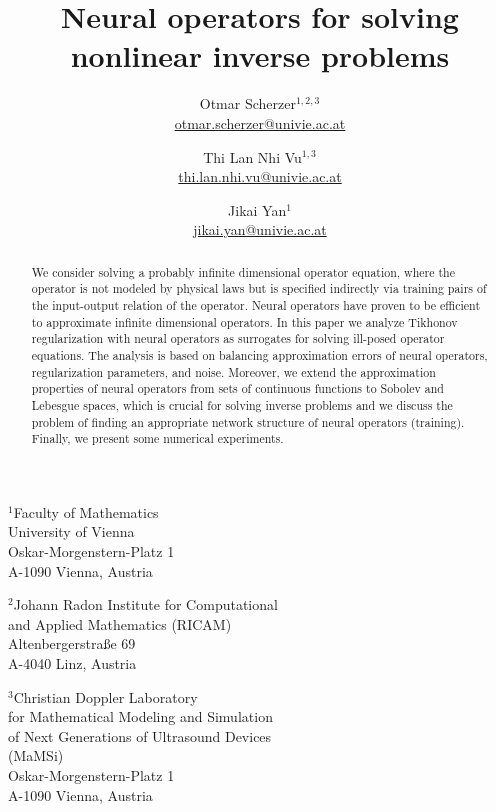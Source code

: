\documentclass[10pt]{article}
\title{Neural operators for solving nonlinear inverse problems}
\author{Otmar Scherzer$^{1,2,3}$\\{\footnotesize\href{mailto:otmar.scherzer@univie.ac.at}{otmar.scherzer@univie.ac.at}}
\and Thi Lan Nhi Vu$^{1,3}$\\
{\footnotesize\href{mailto:thi.lan.nhi.vu@univie.ac.at}{thi.lan.nhi.vu@univie.ac.at}}
\and Jikai Yan$^{1}$ \\{\footnotesize\href{mailto:jikai.yan@univie.ac.at}{jikai.yan@univie.ac.at}}
}
\date{}
\numberwithin{equation}{section}
\theoremstyle{nonumberplain}
\begin{document}
\maketitle
\thispagestyle{empty}
\begin{center}
\parbox[t]{17em}{\footnotesize
\hspace*{-1ex}$^1$Faculty of Mathematics\\
University of Vienna\\
Oskar-Morgenstern-Platz 1\\
A-1090 Vienna, Austria}
\hfil
\parbox[t]{17em}{\footnotesize
\hspace*{-1ex}$^2$Johann Radon Institute for Computational\\
\hspace*{1em}and Applied Mathematics (RICAM)\\
Altenbergerstraße 69\\
A-4040 Linz, Austria}
\end{center}

\begin{center}
\parbox[t]{17em}{\footnotesize
\hspace*{-1ex}$^3$Christian Doppler Laboratory\\
\hspace*{1em}for Mathematical Modeling and Simulation\\
\hspace*{1em}of Next Generations of Ultrasound Devices\\
\hspace*{1em}(MaMSi)\\
Oskar-Morgenstern-Platz 1\\
A-1090 Vienna, Austria}
\end{center}

\setcounter{section}{0}

\begin{abstract}		
	We consider solving a probably infinite dimensional operator equation, where the operator is not modeled by physical laws but is specified indirectly via training pairs of the input-output relation of the operator. 
	Neural operators have proven to be efficient to approximate infinite dimensional operators. 
	In this paper we analyze Tikhonov regularization with neural operators as surrogates for solving ill-posed operator equations. The analysis is based on balancing approximation errors of neural operators, regularization parameters, and noise. Moreover, we extend the approximation properties of neural operators from sets of continuous functions to Sobolev and Lebesgue spaces, which is crucial for solving inverse problems and we discuss the problem of finding an appropriate network structure of neural operators (training). Finally, we present some numerical experiments.  
\end{abstract}
\end{document}
